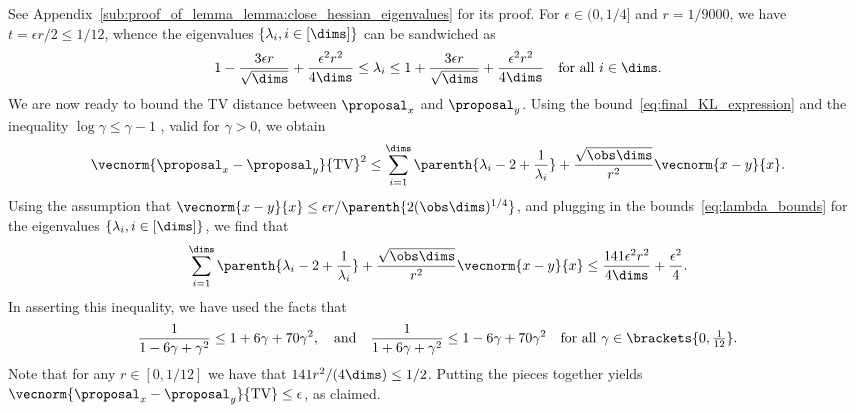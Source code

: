 See Appendix~\ref{sub:proof_of_lemma_lemma:close_hessian_eigenvalues} for its proof.
For $\epsilon \in (0, 1/4]$ and $r = 1/9000$, we have $t = \epsilon r /2 \leq 1/12$, whence the eigenvalues $\{\lambda_i, i \in [\dims]\}$  can be sandwiched as
\begin{align}
	1 - \frac{3 \epsilon r}{\sqrt{\dims}} + \frac{\epsilon^2r^2}{4\dims}
	\leq \lambda_i
	\leq 1 + \frac{3 \epsilon r}{\sqrt{\dims}} + \frac{\epsilon^2r^2}{4\dims} \quad \mbox{for all $i \in \dims$}.
\label{eq:lambda_bounds}
\end{align}
We are now ready to bound the TV distance between $\proposal_x$ and $\proposal_y$.
Using the bound~\eqref{eq:final_KL_expression} and the inequality $\log \gamma \leq \gamma - 1$ , valid for $ \gamma>0$, we obtain
\begin{align*}
	\vecnorm{\proposal_x-\proposal_y}{\text{TV}}^2
	\leq \sum_{i=1}^\dims \parenth{\lambda_i - 2 + \frac{1}{\lambda_i}} + \frac{\sqrt{\obs \dims}}{r^2} \vecnorm{x-y}{x}.
\end{align*}
Using the assumption that $\vecnorm{x-y}{x}\leq {\epsilon r}/\parenth{2(\obs\dims)^{1/4}}$, and plugging in the bounds~\eqref{eq:lambda_bounds} for the eigenvalues $\{\lambda_i, i \in [\dims]\}$, we find that
\begin{align*}
	\sum_{i=1}^\dims \parenth{\lambda_i - 2 + \frac{1}{\lambda_i}} + \frac{\sqrt{\obs \dims}}{r^2} \vecnorm{x-y}{x}
	\leq \frac{141 \epsilon^2 r^2}{4\dims} + \frac{\epsilon^2}{4}.
\end{align*}
In asserting this inequality, we have used the facts that
\begin{align*}
	\frac{1}{1 - 6\gamma + \gamma^2} \leq 1 + 6 \gamma + 70 \gamma^2,
	\quad \text{and}\quad
	\frac{1}{1 + 6\gamma + \gamma^2} \leq 1 - 6\gamma + 70 \gamma^2
	\quad \mbox{for all $\gamma \in \brackets{0, \frac{1}{12}}$}.
\end{align*}
Note that for any  $r \in [0, 1/12]$ we have that $141 r^2/(4\dims) \leq 1/2$.
Putting the pieces together yields $\vecnorm{\proposal_x-\proposal_y}{\text{TV}} \leq \epsilon$, as claimed.


